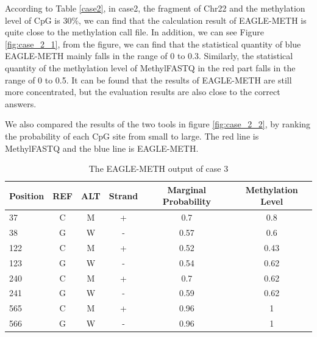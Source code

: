 \documentclass{PHlab-thesis}
\begin{document}
\par According to Table \ref{case2}, in case2, the fragment of Chr22 and the methylation level of CpG is 30\%, we can find that the calculation result of EAGLE-METH is quite close to the methylation call file. In addition, we can see Figure \ref{fig:case_2_1}, from the figure, we can find that the statistical quantity of blue EAGLE-METH mainly falls in the range of 0 to 0.3. Similarly, the statistical quantity of the methylation level of MethylFASTQ in the red part falls in the range of 0 to 0.5. It can be found that the results of EAGLE-METH are still more concentrated, but the evaluation results are also close to the correct answers. 
\par We also compared the results of the two tools in figure \ref{fig:case_2_2}, by ranking the probability of each CpG site from small to large. The red line is MethylFASTQ and the blue line is EAGLE-METH.
\vspace{15mm}
\begin{table}[h!]
	\centering
	\begin{tabular}{l*{5}{c}}
		Position    & REF & ALT & Strand & Marginal Probability & Methylation Level\\
		\hline
		37  & C & M & + & 0.7 & 0.8  \\
		38 & G & W & - & 0.57 & 0.6  \\
		122 & C & M & + & 0.52 & 0.43  \\
		123 & G & W & - & 0.54 & 0.62 \\
		240 & C & M & + & 0.7 & 0.62  \\
    241 & G & W & - & 0.59 & 0.62  \\
		565 & C & M & + & 0.96 & 1  \\
    566 & G & W & - & 0.96 & 1  \\
	\end{tabular}
	\caption{The EAGLE-METH output of case 3}
	\label{case3}
\end{table}
\end{document}
